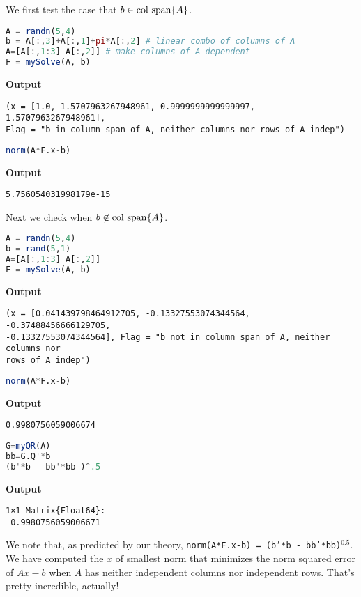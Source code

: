 We first test the case that $b \in \mathrm{col~span} \{ A \}$.

\begin{lstlisting}[language=Julia,style=mystyle]
A = randn(5,4)
b = A[:,3]+A[:,1]+pi*A[:,2] # linear combo of columns of A
A=[A[:,1:3] A[:,2]] # make columns of A dependent
F = mySolve(A, b)
\end{lstlisting}
\textbf{Output} 
\begin{verbatim}
(x = [1.0, 1.5707963267948961, 0.9999999999999997, 1.5707963267948961], 
Flag = "b in column span of A, neither columns nor rows of A indep")
\end{verbatim}


\begin{lstlisting}[language=Julia,style=mystyle]
norm(A*F.x-b)
\end{lstlisting}
\textbf{Output} 
\begin{verbatim}
5.756054031998179e-15
\end{verbatim}

Next we check when $b \not \in \mathrm{col~span} \{ A \}$.

\begin{lstlisting}[language=Julia,style=mystyle]
A = randn(5,4)
b = rand(5,1)
A=[A[:,1:3] A[:,2]]
F = mySolve(A, b)
\end{lstlisting}
\textbf{Output} 
\begin{verbatim}
(x = [0.041439798464912705, -0.13327553074344564, -0.37488456666129705,
-0.13327553074344564], Flag = "b not in column span of A, neither columns nor 
rows of A indep")
\end{verbatim}


\begin{lstlisting}[language=Julia,style=mystyle]
norm(A*F.x-b)
\end{lstlisting}
\textbf{Output} 
\begin{verbatim}
0.9980756059006674
\end{verbatim}

\begin{lstlisting}[language=Julia,style=mystyle]
G=myQR(A)
bb=G.Q'*b
(b'*b - bb'*bb )^.5
\end{lstlisting}
\textbf{Output} 
\begin{verbatim}
1×1 Matrix{Float64}:
 0.9980756059006671
\end{verbatim}

We note that, as predicted by our theory, \texttt{norm(A*F.x-b) = (b'*b - bb'*bb)$^{0.5}$}. We have computed the $x$ of smallest norm that minimizes the norm squared error of $Ax-b$ when $A$ has neither independent columns nor independent rows. That's pretty incredible, actually! 